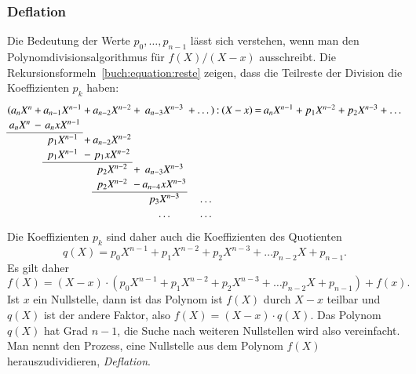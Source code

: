 \subsubsection{Deflation}
Die Bedeutung der Werte $p_0,\dots,p_{n-1}$ lässt sich verstehen, wenn
man den Polynomdivisionsalgorithmus für $f(X) / (X-x)$ ausschreibt.
%
Die Rekursionsformeln~\eqref{buch:equation:reste} zeigen, dass die
Teilreste der Division die Koeffizienten $p_k$ haben:
%
%
\begin{equation}
\setcounter{MaxMatrixCols}{20}
\setlength\arraycolsep{1pt}
\renewcommand\arraystretch{1.15}
\begin{matrix}
(a_nX^n&+&a_{n-1}X^{n-1}&+&a_{n-2}X^{n-2}&+&a_{n-3}X^{n-3}&+&\dots)&:&(X&-&x)&=&a_nX^{n-1}+p_1X^{n-2}+p_2X^{n-3}+\dots\\
 a_nX^n&-&a_{n}xX^{n-1} & &              & &              & &      & &  & &  & &                \\
\cline{1-3}
       & &p_1X^{n-1}    &+&a_{n-2}X^{n-2}& &              & &      & &  & &  & &                \\
       & &p_1X^{n-1}    &-&p_1xX^{n-2}   & &              & &      & &  & &  & &                \\
\cline{3-5}
       & &              & &p_2X^{n-2}    &+&a_{n-3}X^{n-3}& &      & &  & &  & &\\
       & &              & &p_2X^{n-2}    &-&a_{n-4}xX^{n-3}&&      & &  & &  &\\
\cline{5-7}
       & &              & &              & &p_3X^{n-3}     &&\dots & &  & &  &\\
       & &              & &              & &\dots          &&\dots & &  & &  &\\
\end{matrix}
\end{equation}
Die Koeffizienten $p_k$ sind daher auch die Koeffizienten des Quotienten
\[
q(X)
=
p_0X^{n-1}+p_1X^{n-2}+p_2X^{n-3}+\dots p_{n-2}X+p_{n-1}.
\]
Es gilt daher
\[
f(X)
=
(X-x) \cdot (p_0X^{n-1}+p_1X^{n-2}+p_2X^{n-3}+\dots p_{n-2}X+p_{n-1})
+
f(x).
\]
Ist $x$ ein Nullstelle, dann ist das Polynom ist $f(X)$ durch $X-x$ teilbar
und $q(X)$ ist der andere Faktor, also $f(X)=(X-x)\cdot q(X)$.
Das Polynom $q(X)$ hat Grad $n-1$, die Suche nach weiteren Nullstellen
wird also vereinfacht. 
Man nennt den Prozess, eine Nullstelle aus dem Polynom $f(X)$
herauszudividieren, {\em Deflation}.
%
%

